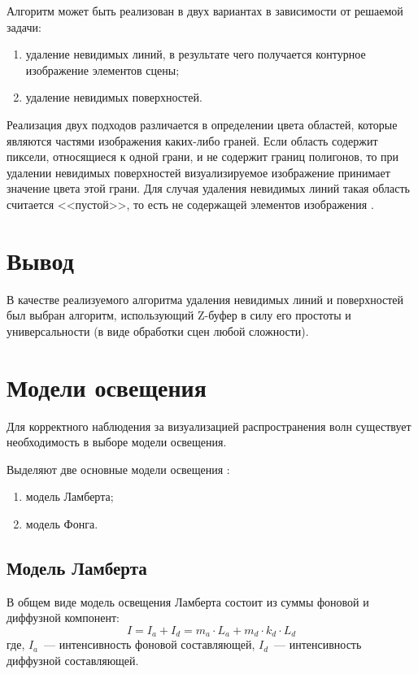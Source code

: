 Алгоритм может быть реализован в двух вариантах в зависимости от решаемой задачи:
\begin{enumerate}
	\item удаление невидимых линий, в результате чего получается контурное изображение элементов сцены;
	\item удаление невидимых поверхностей.
\end{enumerate}

Реализация двух подходов различается в определении цвета областей, которые являются частями изображения каких-либо граней. 
Если область содержит пиксели, относящиеся к одной грани, и не содержит границ полигонов, то при удалении невидимых поверхностей визуализируемое изображение принимает значение цвета этой грани.
Для случая удаления невидимых линий такая область считается <<пустой>>, то есть не содержащей элементов изображения \cite{base}.

\section*{Вывод}

В качестве реализуемого алгоритма удаления невидимых линий и поверхностей был выбран алгоритм, использующий Z-буфер в силу его простоты и универсальности (в виде обработки сцен любой сложности).

\clearpage

\section{Модели освещения}

Для корректного наблюдения за визуализацией распространения волн существует необходимость в выборе модели освещения.

Выделяют две основные модели освещения \cite{baseLight}:
\begin{enumerate}
	\item модель Ламберта;
	\item модель Фонга.
\end{enumerate}

\subsection{Модель Ламберта}

В общем виде модель освещения Ламберта состоит из суммы фоновой и диффузной компонент:
\begin{equation}\label{equ:lambert}
	I = I_{a} + I_{d} = m_{a} \cdot L_{a} + m_{d} \cdot k_{d} \cdot L_{d}
\end{equation}
где, $I_{a}$~--- интенсивность фоновой составляющей,
\newline $I_{d}$~--- интенсивность диффузной составляющей.

